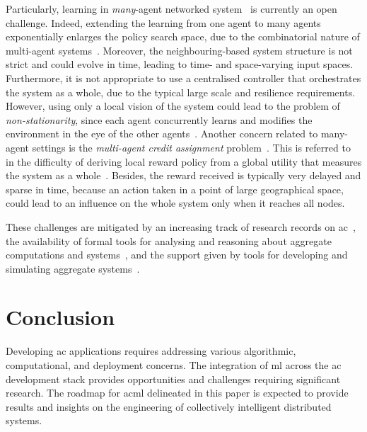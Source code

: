 Particularly, learning in \emph{many}-agent networked system~\cite{DBLP:journals/jzusc/ZhangYB21} is currently an open challenge.
%
Indeed, extending the learning from one agent to many agents exponentially enlarges the policy search space, due to the combinatorial nature of multi-agent systems~\cite{DBLP:journals/aamas/Hernandez-LealK19}.
%
Moreover, the neighbouring-based system structure is not strict and could evolve in time, leading to time- and space-varying input spaces.
%
Furthermore, it is not appropriate to use a centralised controller that orchestrates the system as a whole, due to the typical large scale and resilience requirements.
%
However, using only a local vision of the system could lead to the problem of \emph{non-stationarity}, since each agent concurrently learns and modifies the environment in the eye of the other agents~\cite{DBLP:journals/aim/TuylsW12}.
%
Another concern related to many-agent settings is the \emph{multi-agent credit assignment} problem~\cite{DBLP:books/lib/SuttonB98}.
%
This is referred to in the difficulty of deriving local reward policy from a global utility that measures the system as a whole~\cite{DBLP:conf/atal/AgoginoT04,DBLP:books/lib/SuttonB98}. 
%
Besides, the reward received is typically very delayed and sparse in time, because an action taken in a point of large geographical space, could lead to an influence on the whole system only when it reaches all nodes.

These challenges are mitigated 
 by an increasing track of research records on \ac{ac}~\cite{DBLP:journals/jlap/ViroliBDACP19},
 the availability of formal tools for 
 analysing and reasoning about aggregate computations and systems~\cite{DBLP:journals/jlap/ViroliBDACP19},
 and the support given by tools for 
 developing and simulating aggregate systems~\cite{DBLP:journals/jlap/ViroliBDACP19}.


\section{Conclusion}
%
Developing \ac{ac} applications
 requires addressing
 various
 algorithmic,
 computational,
 and deployment concerns.
%
The integration of \ac{ml} 
 across the \ac{ac} development stack
 provides opportunities and challenges
 requiring significant research.
%
The roadmap for \ac{acml} delineated in this paper
 is expected to provide results and insights
 on the engineering of collectively intelligent distributed systems.
 
\printbibliography


